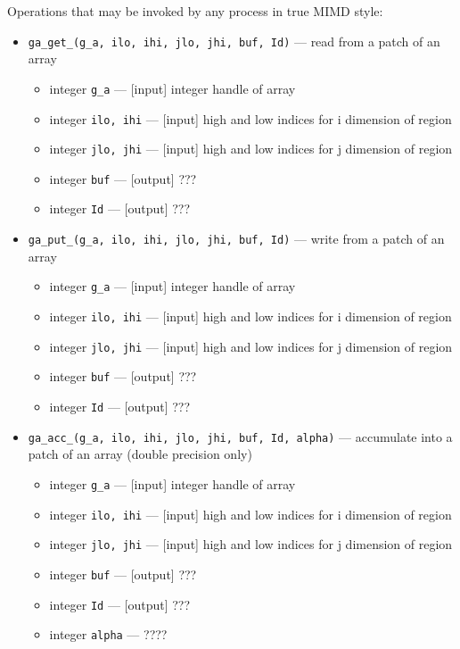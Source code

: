 Operations that may be invoked by any process in true MIMD style:
\begin{itemize}
\item {\tt ga\_get\_(g\_a, ilo, ihi, jlo, jhi, buf, Id)} --- read from a patch of an array
\begin{itemize}
\item     integer {\tt g\_a}         --- [input] integer handle of array
\item     integer {\tt ilo, ihi}    --- [input] high and low indices for i dimension of region
\item     integer {\tt jlo, jhi}    --- [input] high and low indices for j dimension of region
\item     integer {\tt buf}         --- [output] ???
\item     integer {\tt Id}          --- [output] ???
\end{itemize}

\item {\tt ga\_put\_(g\_a, ilo, ihi, jlo, jhi, buf, Id)} --- write from a patch of an array
\begin{itemize}
\item     integer {\tt g\_a}         --- [input] integer handle of array
\item     integer {\tt ilo, ihi}    --- [input] high and low indices for i dimension of region
\item     integer {\tt jlo, jhi}    --- [input] high and low indices for j dimension of region
\item     integer {\tt buf}         --- [output] ???
\item     integer {\tt Id}          --- [output] ???
\end{itemize}

\item {\tt ga\_acc\_(g\_a, ilo, ihi, jlo, jhi, buf, Id, alpha)} --- accumulate into a patch of an array (double
  precision only)
\begin{itemize}
\item     integer {\tt g\_a}         --- [input] integer handle of array
\item     integer {\tt ilo, ihi}    --- [input] high and low indices for i dimension of region
\item     integer {\tt jlo, jhi}    --- [input] high and low indices for j dimension of region
\item     integer {\tt buf}         --- [output] ???
\item     integer {\tt Id}          --- [output] ???
\item     integer {\tt alpha}       ---  ????
\end{itemize}


\end{itemize}
